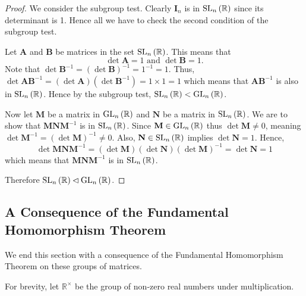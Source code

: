 \begin{proof}
    We consider the subgroup test. Clearly $\textbf{I}_n$ is in $\mathrm{SL}_{n}\left(\mathbb{R}\right)$ since its determinant is 1. Hence all we have to check the second condition of the subgroup test.

    Let \textbf{A} and \textbf{B} be matrices in the set $\mathrm{SL}_{n}\left(\mathbb{R}\right)$. This means that
    \[
        \det \textbf{A} = 1 \text{ and } \det \textbf{B} = 1.
    \]
    Note that $\det \textbf{B}^{-1} = (\det \textbf{B})^{-1} = 1^{-1} = 1$. Thus, $\det \textbf{AB}^{-1} = (\det \textbf{A})(\det \textbf{B}^{-1}) = 1 \times 1  = 1$ which means that $\textbf{AB}^{-1}$ is also in $\mathrm{SL}_{n}\left(\mathbb{R}\right)$. Hence by the subgroup test, $\mathrm{SL}_{n}\left(\mathbb{R}\right) < \mathrm{GL}_{n}\left(\mathbb{R}\right)$.
    
    Now let $\textbf{M}$ be a matrix in $\mathrm{GL}_{n}\left(\mathbb{R}\right)$ and $\textbf{N}$ be a matrix in $\mathrm{SL}_{n}\left(\mathbb{R}\right)$. We are to show that $\textbf{MNM}^{-1}$ is in $\mathrm{SL}_{n}\left(\mathbb{R}\right)$. Since $\textbf{M} \in \mathrm{GL}_{n}\left(\mathbb{R}\right)$ thus $\det \textbf{M} \neq 0$, meaning $\det \textbf{M}^{-1} = (\det \textbf{M})^{-1} \neq 0$. Also, $\textbf{N} \in \mathrm{SL}_{n}\left(\mathbb{R}\right)$ implies $\det \textbf{N} = 1$. Hence,
    \[
        \det \textbf{MNM}^{-1} = (\det \textbf{M})(\det \textbf{N})(\det \textbf{M})^{-1} = \det \textbf{N} = 1
    \]
    which means that $\textbf{MNM}^{-1}$ is in $\mathrm{SL}_{n}\left(\mathbb{R}\right)$.

    Therefore $\mathrm{SL}_{n}\left(\mathbb{R}\right) \lhd \mathrm{GL}_{n}\left(\mathbb{R}\right)$.
\end{proof}

\newpage

\subsection{A Consequence of the Fundamental Homomorphism Theorem}
We end this section with a consequence of the Fundamental Homomorphism Theorem on these groups of matrices. 

For brevity, let $\mathbb{R}^\times$ be the group of non-zero real numbers under multiplication.

